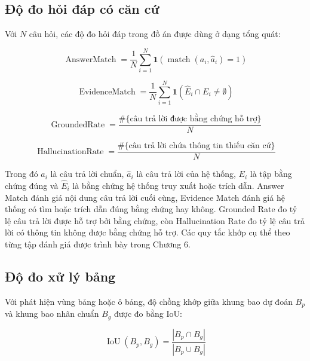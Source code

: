 \documentclass[../DoAn.tex]{subfiles}
\begin{document}
\subsection{Độ đo hỏi đáp có căn cứ}

Với \(N\) câu hỏi, các độ đo hỏi đáp trong đồ án được dùng ở dạng tổng quát:

\begin{equation}
\label{eq:answer-match}
\operatorname{AnswerMatch} =
\frac{1}{N}
\sum_{i=1}^{N}
\mathbf{1}\left(\operatorname{match}(a_i,\hat{a}_i)=1\right)
\end{equation}

\begin{equation}
\label{eq:evidence-match}
\operatorname{EvidenceMatch} =
\frac{1}{N}
\sum_{i=1}^{N}
\mathbf{1}\left(\hat{E}_i \cap E_i \neq \emptyset\right)
\end{equation}

\begin{equation}
\label{eq:grounded-rate}
\operatorname{GroundedRate} =
\frac{\#\{\text{câu trả lời được bằng chứng hỗ trợ}\}}{N}
\end{equation}

\begin{equation}
\label{eq:hallucination-rate}
\operatorname{HallucinationRate} =
\frac{\#\{\text{câu trả lời chứa thông tin thiếu căn cứ}\}}{N}
\end{equation}

Trong đó \(a_i\) là câu trả lời chuẩn, \(\hat{a}_i\) là câu trả lời của hệ thống,
\(E_i\) là tập bằng chứng đúng và \(\hat{E}_i\) là bằng chứng hệ thống truy xuất hoặc
trích dẫn.
Answer Match đánh giá nội dung câu trả lời cuối cùng, Evidence Match đánh giá
hệ thống có tìm hoặc trích dẫn đúng bằng chứng hay không. Grounded Rate đo tỷ lệ
câu trả lời được hỗ trợ bởi bằng chứng, còn Hallucination Rate đo tỷ lệ câu trả lời có
thông tin không được bằng chứng hỗ trợ. Các quy tắc khớp cụ thể theo từng tập đánh giá
được trình bày trong Chương 6.

\subsection{Độ đo xử lý bảng}

Với phát hiện vùng bảng hoặc ô bảng, độ chồng khớp giữa khung bao dự đoán \(B_p\)
và khung bao nhãn chuẩn \(B_g\) được đo bằng IoU:

\begin{equation}
\label{eq:iou}
\operatorname{IoU}(B_p,B_g)=
\frac{|B_p \cap B_g|}{|B_p \cup B_g|}
\end{equation}
\end{document}
